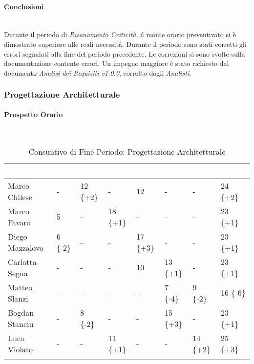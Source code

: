 \paragraph{Conclusioni} ~\\

Durante il periodo di \textit{Risanamento Criticità}, il monte orario preventivato si è dimostrato superiore alle reali necessità. Durante il periodo sono stati corretti gli errori segnalati alla fine del periodo precedente. Le correzioni si sono svolte sulla documentazione contente errori. Un impegno maggiore è stato richiesto dal documento \textit{Analisi dei Requisiti v1.0.0}, corretto dagli \textit{Analisti}. \\

\newpage

\subsubsection{Progettazione Architetturale}
\label{pa}

\paragraph{Prospetto Orario} ~\\

\begin{longtable}{|C{.30\textwidth}|C{.06\textwidth}|C{.06\textwidth}|C{.06\textwidth} | C{.06\textwidth}| C{.06\textwidth} | C{.06\textwidth} | C{.10\textwidth} |}
\hline
{}	\textbf{\textcolor{white}{Nome}} & \textbf{\textcolor{white}{RE}} & \textbf{\textcolor{white}{AM}} & \textbf{\textcolor{white}{AN}} & \textbf{\textcolor{white}{PJ}} & \textbf{\textcolor{white}{PR}} & \textbf{\textcolor{white}{VE}} & \textbf{\textcolor{white}{Totale}}\\
\hline 
Marco Chilese & - & 12 \{+2\} & - & 12 & - & - & 24 \{+2\} \\
\hline
{}Marco Favaro & 5 & - & 18 \{+1\}  & - & - & - & 23 \{+1\} \\
\hline
Diego Mazzalovo & 6 \{-2\}& - & - & 17 \{+3\} & - & - & 23 \{+1\} \\ 
\hline
{}Carlotta Segna & - & - & - & 10 & 13 \{+1\} & - & 23 \{+1\} \\
\hline
Matteo Slanzi & - & - & - & - & 7 \{-4\} & 9 \{-2\} & 16 \{-6\} \\
\hline
{}Bogdan Stanciu & - & 8 \{-2\}& - & - & 15 \{+3\} & - & 23 \{+1\} \\
\hline
Luca Violato & - & - & 11 \{+1\} & - & - & 14 \{+2\} & 25 \{+3\} \\
\hline 

\caption{Consuntivo di Fine Periodo: Progettazione Architetturale}
\label{Distribuzione oraria del periodo di pa}
\end{longtable}


